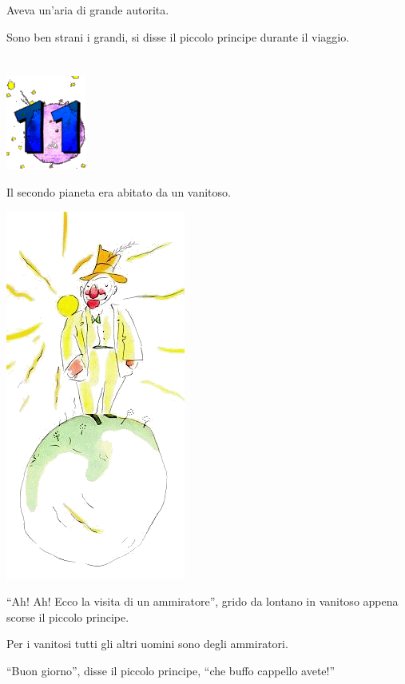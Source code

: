 \documentclass[11pt]{scrbook}
\begin{document}
Aveva un'aria di grande autorita.

Sono ben strani i grandi, si disse il piccolo principe durante il
viaggio.

\chapter{}
\begin{center}
\includegraphics{./img/chapter11.png}
\end{center}

Il secondo pianeta era abitato da un vanitoso.

\begin{center}
\includegraphics{./img/11a.png}
\end{center}

``Ah! Ah! Ecco la visita di un ammiratore'', grido da lontano in
vanitoso appena scorse il piccolo principe.

Per i vanitosi tutti gli altri uomini sono degli ammiratori.

``Buon giorno'', disse il piccolo principe, ``che buffo cappello
avete!''
\end{document}
